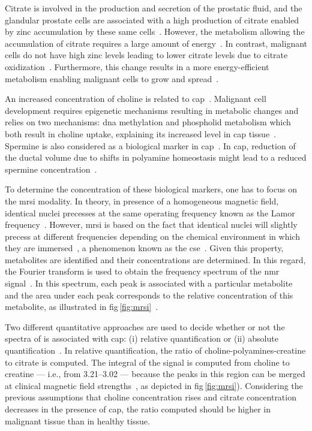 Citrate is involved in the production and secretion of the prostatic fluid, and the glandular prostate cells are associated with a high production of citrate enabled by zinc accumulation by these same cells~\cite{Costello2006}.
However, the metabolism allowing the accumulation of citrate requires a large amount of energy~\cite{Costello2006}.
In contrast, malignant cells do not have high zinc levels leading to lower citrate levels due to citrate oxidization~\cite{Costello2006}.
Furthermore, this change results in a more energy-efficient metabolism enabling malignant cells to grow and spread~\cite{Costello2006}.

An increased concentration of choline is related to \ac{cap}~\cite{Awwad2012}.
Malignant cell development requires epigenetic mechanisms resulting in metabolic changes and relies on two mechanisms: \ac{dna} methylation and phospholid metabolism which both result in choline uptake, explaining its increased level in \ac{cap} tissue~\cite{Awwad2012}.
Spermine is also considered as a biological marker in \ac{cap}~\cite{Graaf2000,Giskeodegard2013}.
In \ac{cap}, reduction of the ductal volume due to shifts in polyamine homeostasis might lead to a reduced spermine concentration~\cite{Graaf2000}.

To determine the concentration of these biological markers, one has to focus on the \ac{mrsi} modality.
In theory, in presence of a homogeneous magnetic field, identical nuclei precesses at the same operating frequency known as the Lamor frequency~\cite{Haacke1999}.
However, \ac{mrsi} is based on the fact that identical nuclei will slightly precess at different frequencies depending on the chemical environment in which they are immersed~\cite{Haacke1999}, a phenomenon known as the \ac{cse}~\cite{Parfait2010}.
Given this property, metabolites are identified and their concentrations are determined.
In this regard, the Fourier transform is used to obtain the frequency spectrum of the \ac{nmr} signal~\cite{Haacke1999,Parfait2010}.
In this spectrum, each peak is associated with a particular metabolite and the area under each peak corresponds to the relative concentration of this metabolite, as illustrated in \acs{fig}\,\ref{fig:mrsi}~\cite{Parfait2010}.

Two different quantitative approaches are used to decide whether or not the spectra of  is associated with \ac{cap}: (i) relative quantification or (ii) absolute quantification~\cite{Lemaitre2011}.
In relative quantification, the ratio of choline-polyamines-creatine to citrate is computed.
The integral of the signal is computed from choline to creatine --- i.e., from \SIrange{3.21}{3.02}{\ppm} --- because the peaks in this region can be merged at clinical magnetic field strengths~\cite{Hoeks2011,Graaf2000}, as depicted in \acs{fig}\,\ref{fig:mrsi}).
Considering the previous assumptions that choline concentration rises and citrate concentration decreases in the presence of \ac{cap}, the ratio computed should be higher in malignant tissue than in healthy tissue. 

